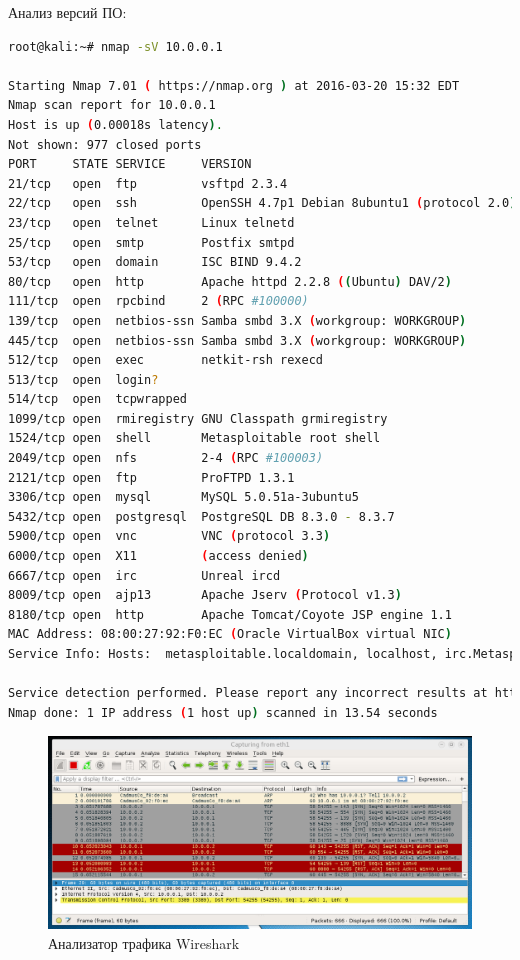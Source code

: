 Анализ версий ПО:

\begin{lstlisting}[language=bash]
root@kali:~# nmap -sV 10.0.0.1

Starting Nmap 7.01 ( https://nmap.org ) at 2016-03-20 15:32 EDT
Nmap scan report for 10.0.0.1
Host is up (0.00018s latency).
Not shown: 977 closed ports
PORT     STATE SERVICE     VERSION
21/tcp   open  ftp         vsftpd 2.3.4
22/tcp   open  ssh         OpenSSH 4.7p1 Debian 8ubuntu1 (protocol 2.0)
23/tcp   open  telnet      Linux telnetd
25/tcp   open  smtp        Postfix smtpd
53/tcp   open  domain      ISC BIND 9.4.2
80/tcp   open  http        Apache httpd 2.2.8 ((Ubuntu) DAV/2)
111/tcp  open  rpcbind     2 (RPC #100000)
139/tcp  open  netbios-ssn Samba smbd 3.X (workgroup: WORKGROUP)
445/tcp  open  netbios-ssn Samba smbd 3.X (workgroup: WORKGROUP)
512/tcp  open  exec        netkit-rsh rexecd
513/tcp  open  login?
514/tcp  open  tcpwrapped
1099/tcp open  rmiregistry GNU Classpath grmiregistry
1524/tcp open  shell       Metasploitable root shell
2049/tcp open  nfs         2-4 (RPC #100003)
2121/tcp open  ftp         ProFTPD 1.3.1
3306/tcp open  mysql       MySQL 5.0.51a-3ubuntu5
5432/tcp open  postgresql  PostgreSQL DB 8.3.0 - 8.3.7
5900/tcp open  vnc         VNC (protocol 3.3)
6000/tcp open  X11         (access denied)
6667/tcp open  irc         Unreal ircd
8009/tcp open  ajp13       Apache Jserv (Protocol v1.3)
8180/tcp open  http        Apache Tomcat/Coyote JSP engine 1.1
MAC Address: 08:00:27:92:F0:EC (Oracle VirtualBox virtual NIC)
Service Info: Hosts:  metasploitable.localdomain, localhost, irc.Metasploitable.LAN; OSs: Unix, Linux; CPE: cpe:/o:linux:linux_kernel

Service detection performed. Please report any incorrect results at https://nmap.org/submit/ .
Nmap done: 1 IP address (1 host up) scanned in 13.54 seconds
\end{lstlisting}

\begin{figure}[H]
	\includegraphics[width=\textwidth]{wireshark.png}
	\caption{Анализатор трафика Wireshark}
\end{figure}

